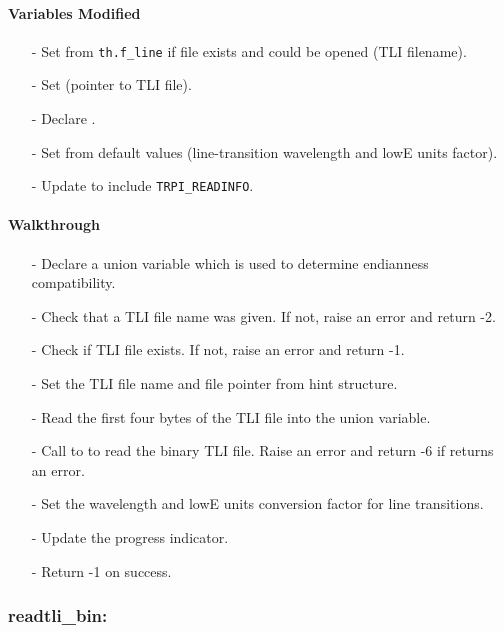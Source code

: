 \documentclass[letterpaper,12pt]{article}
\begin{document}
\paragraph{Variables Modified}
\begin{enumerate}[leftmargin=10pt, noitemsep, parsep=0pt, topsep=0ex]
\item[-] Set  from {\tt th.f\_line} if file
  exists and could be opened (TLI filename).
\item[-] Set  (pointer to TLI file).
\item[-] Declare .
\item[-] Set  from
  default values (line-transition wavelength and lowE units factor).
\item[-] Update  to include {\tt TRPI\_READINFO}.
\end{enumerate}

\paragraph{Walkthrough}
\begin{enumerate}[leftmargin=10pt, noitemsep, parsep=0pt, topsep=0ex]
\item[-] Declare a union variable which is used to determine endianness compatibility.
\item[-] Check that a TLI file name was given. If not, raise an error and return -2.
\item[-] Check if TLI file exists. If not, raise an error and return -1.
\item[-] Set the TLI file name and file pointer from hint structure.
\item[-] Read the first four bytes of the TLI file into the union variable.
\item[-] Call to  to read the binary TLI file. Raise an error and return -6 if  returns an error.
\item[-] Set the wavelength and lowE units conversion factor for line transitions.
\item[-] Update the progress indicator.
\item[-] Return -1 on success.
\end{enumerate}

\subsubsection{readtli\_bin:}
\end{document}
